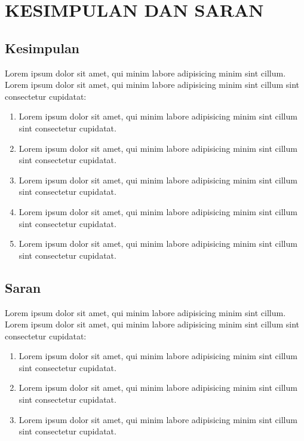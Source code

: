 \chapter{KESIMPULAN DAN SARAN}

\section{Kesimpulan}
Lorem ipsum dolor sit amet, qui minim labore adipisicing minim sint cillum. Lorem ipsum dolor sit amet, qui minim labore adipisicing minim sint cillum sint consectetur cupidatat:

\begin{enumerate}
	\item Lorem ipsum dolor sit amet, qui minim labore adipisicing minim sint cillum sint consectetur cupidatat.
	\item Lorem ipsum dolor sit amet, qui minim labore adipisicing minim sint cillum sint consectetur cupidatat.
	\item Lorem ipsum dolor sit amet, qui minim labore adipisicing minim sint cillum sint consectetur cupidatat.
	\item Lorem ipsum dolor sit amet, qui minim labore adipisicing minim sint cillum sint consectetur cupidatat.
	\item Lorem ipsum dolor sit amet, qui minim labore adipisicing minim sint cillum sint consectetur cupidatat.
\end{enumerate}


\section{Saran}
Lorem ipsum dolor sit amet, qui minim labore adipisicing minim sint cillum. Lorem ipsum dolor sit amet, qui minim labore adipisicing minim sint cillum sint consectetur cupidatat:

\begin{enumerate}
	\item Lorem ipsum dolor sit amet, qui minim labore adipisicing minim sint cillum sint consectetur cupidatat.
	\item Lorem ipsum dolor sit amet, qui minim labore adipisicing minim sint cillum sint consectetur cupidatat.
	\item Lorem ipsum dolor sit amet, qui minim labore adipisicing minim sint cillum sint consectetur cupidatat.
\end{enumerate}

